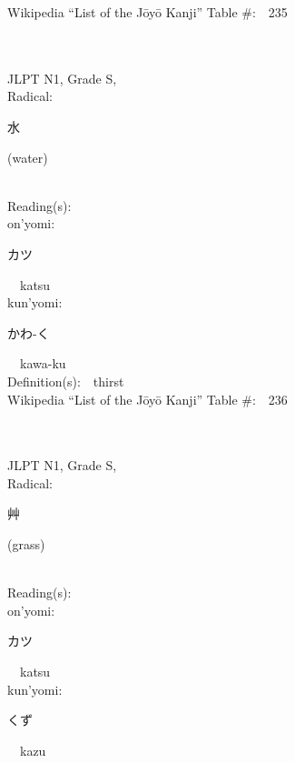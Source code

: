 \begin{multicols}{2}
Wikipedia ``List of the J\=oy\=o Kanji'' Table \#:\ \ 235 \\
\ \ \\
{\fontsize{34pt}{40pt}  }\ \ \\
{JLPT N1, Grade S, \\Radical:\ \ {\begin{CJK}{UTF8}{min} 水 \end{CJK}} (water) } \\
Reading(s):\ \ \\
{\hspace*{1em}}on'yomi:\ \ \\
{\hspace*{2em}}{\begin{CJK}{UTF8}{min} カツ \end{CJK}}\ \ katsu\ \ \\
{\hspace*{1em}}kun'yomi:\ \ \\
{\hspace*{2em}}{\begin{CJK}{UTF8}{min} かわ-く \end{CJK}}\ \ kawa-ku\ \ \\
Definition(s):\ \ thirst \\
Wikipedia ``List of the J\=oy\=o Kanji'' Table \#:\ \ 236 \\
\ \ \\
{\fontsize{34pt}{40pt}  }\ \ \\
{JLPT N1, Grade S, \\Radical:\ \ {\begin{CJK}{UTF8}{min} 艸 \end{CJK}} (grass) } \\
Reading(s):\ \ \\
{\hspace*{1em}}on'yomi:\ \ \\
{\hspace*{2em}}{\begin{CJK}{UTF8}{min} カツ \end{CJK}}\ \ katsu\ \ \\
{\hspace*{1em}}kun'yomi:\ \ \\
{\hspace*{2em}}{\begin{CJK}{UTF8}{min} くず \end{CJK}}\ \ kazu\ \ \\

\end{multicols}
